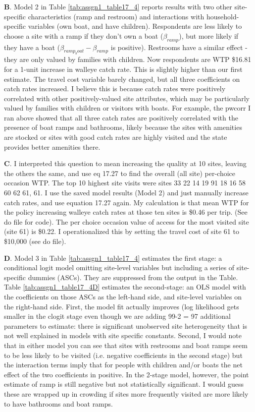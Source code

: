\documentclass[12pt]{article}
\begin{document}
\textbf{B}.  Model 2 in Table \ref{tab:assgn1_table17_4} reports results with two other site-specific characteristics (ramp and restroom) and interactions with household-specific variables (own boat, and have children).  Respondents are less likely to choose a site with a ramp if they don't own a boat ($\beta _{ramp}$), but more likely if they have a boat ($\beta _{ramp_boat} - \beta _{ramp}$ is positive). Restrooms have a similar effect - they are only valued by families with children. Now respondents are WTP \$16.81 for a 1-unit increase in walleye catch rate.  This is slightly higher than our first estimate. The travel cost variable barely changed, but all three coefficients on catch rates increased. I believe this is because catch rates were positively correlated with other positively-valued site attributes, which may be particularly valued by families with children or visitors with boats.  For example, the pwcorr I ran above showed that all three catch rates are positively correlated with the presence of boat ramps and bathrooms, likely because the  sites with amenities are stocked or sites with good catch rates are highly visited and the state provides better amenities there.


\textbf{C}. I interpreted this question to mean increasing the quality at 10 sites, leaving the others the same, and use eq 17.27 to find the overall (all site) per-choice occasion WTP. The top 10 highest site visits were sites 33 22 14 19 91 18 16 58 60 62 61, 61.  I use the saved model results (Model 2) and just manually increase catch rates, and use equation 17.27 again. My calculation is that mean WTP for the policy increasing walleye catch rates at those ten sites is \$0.46 per trip. (See do file for code). The per choice occasion value of access for the most visited site (site 61) is \$0.22.  I operationalized this by setting the travel cost of site 61 to \$10,000 (see do file).


\textbf{D}. Model 3 in Table \ref{tab:assgn1_table17_4} estimates the first stage: a conditional logit model omitting site-level variables but including a series of site-specific dummies (ASCs).  They are suppressed from the output in the Table.  Table \ref{tab:assgn1_table17_4D} estimates the second-stage: an OLS model with the coefficients on those ASCs as the left-hand side, and site-level variables on the right-hand side.  First, the model fit actually improves (log likelihood gets smaller in the clogit stage even though we are adding 99-2 = 97 additional parameters to estimate:  there is significant unobserved site heterogeneity that is not well explained in models with site specific constants.  Second, I would note that in either model you can see that sites with restrooms and boat ramps seem to be less likely to be visited (i.e. negative coefficients in the second stage) but the interaction terms imply that for people with children and/or boats the net effect of the two coefficients in positive.  In the 2-stage model, however, the point estimate of ramp is still negative but not statistically significant.  I would guess these are wrapped up in crowding if sites more frequently visited are more likely to have bathrooms and boat ramps.  
\end{document}
